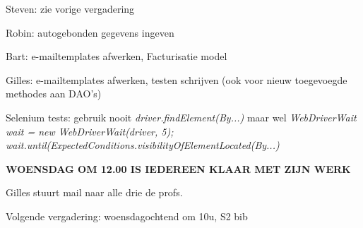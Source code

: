 \documentclass[11pt,a4paper,oneside]{article}
\renewenvironment{itemize}[1]{\begin{compactitem}#1}{\end{compactitem}}
\begin{document}
\begin{itemize}
\begin{itemize}
                    \item Steven: zie vorige vergadering
                    
                    \item Robin: autogebonden gegevens ingeven
                    
                    \item Bart: e-mailtemplates afwerken, Facturisatie model
                    
                    \item Gilles: e-mailtemplates afwerken, testen schrijven (ook voor nieuw toegevoegde methodes aan DAO's)
        		\end{itemize}
        		
       \item Selenium tests: gebruik nooit \emph{driver.findElement(By...)} maar wel \emph{WebDriverWait wait = new WebDriverWait(driver, 5); wait.until(ExpectedConditions.visibilityOfElementLocated(By...)}
       
       \item \textbf{WOENSDAG OM 12.00 IS IEDEREEN KLAAR MET ZIJN WERK}
       
       \item Gilles stuurt mail naar alle drie de profs.
       
       \item Volgende vergadering: woensdagochtend om 10u, S2 bib
		
	\end{itemize}
\end{document}
